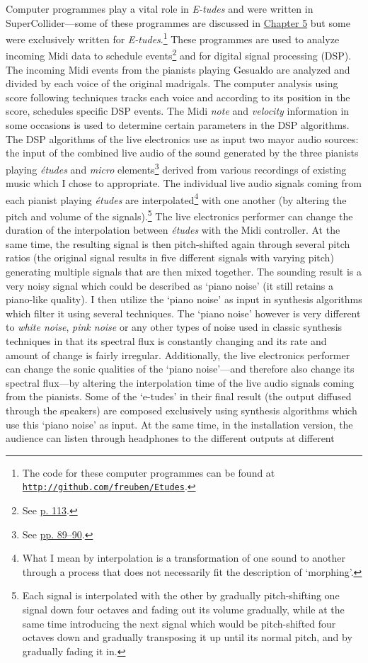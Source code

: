 Computer programmes play a vital role in \emph{E-tudes} and were written in SuperCollider---some of these programmes are discussed in \hyperlink{chapter5}{Chapter 5} but some were exclusively written for \emph{E-tudes}.\footnote{The code for these computer programmes can be found at \href{http://github.com/freuben/Etudes}{\texttt {http://github.com/freuben/Etudes}}.} These programmes are used to analyze incoming Midi data to schedule events\footnote{See \hyperlink{miditrig}{p. 113}.} and for digital signal processing (DSP). The incoming Midi events from the pianists playing Gesualdo are analyzed and divided by each voice of the original madrigals. The computer analysis using score following techniques tracks each voice and according to its position in the score, schedules specific DSP events. The Midi \emph{note} and \emph{velocity} information in some occasions is used to determine certain parameters in the DSP algorithms. The DSP algorithms of the live electronics use as input two mayor audio sources: the input of the combined live audio of the sound generated by the three pianists playing \emph{\'{e}tudes} and \emph{micro} elements\footnote{See \hyperlink{macroplunder}{pp. 89--90}.} derived from various recordings of existing music which I chose to appropriate. The individual live audio signals coming from each pianist playing \emph{\'{e}tudes} are interpolated\footnote{What I mean by interpolation is a transformation of one sound to another through a process that does not necessarily fit the description of `morphing'.} with one another (by altering the pitch and volume of the signals).\footnote{Each signal is interpolated with the other by gradually pitch-shifting one signal down four octaves and fading out its volume gradually, while at the same time introducing the next signal which would be pitch-shifted four octaves down and gradually transposing it up until its normal pitch, and by gradually fading it in.} The live electronics performer can change the duration of the interpolation between \emph{\'{e}tudes} with the Midi controller. At the same time, the resulting signal is then pitch-shifted again through several pitch ratios (the original signal results in five different signals with varying pitch) generating multiple signals that are then mixed together. The sounding result is a very noisy signal which could be described as `piano noise' (it still retains a piano-like quality). I then utilize the `piano noise' as input in synthesis algorithms which filter it using several techniques. The `piano noise' however is very different to \emph{white noise}, \emph{pink noise} or any other types of noise used in classic synthesis techniques in that its spectral flux is constantly changing and its rate and amount of change is fairly irregular. Additionally, the live electronics performer can change the sonic qualities of the `piano noise'---and therefore also change its spectral flux---by altering the interpolation time of the live audio signals coming from the pianists. Some of the `e-tudes' in their final result (the output diffused through the speakers) are composed exclusively using synthesis algorithms which use this `piano noise' as input. At the same time, in the installation version, the audience can listen through headphones to the different outputs at different 